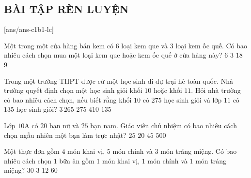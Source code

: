 \subsection{BÀI TẬP RÈN LUYỆN}
 
\setcounter{ex}{0}
[ans/ans-c1b1-lc]
\begin{ex}%
	Một trong một cửa hàng bán kem có $6$ loại kem que và $3$ loại kem ốc quế. Có bao nhiêu cách chọn mua một loại kem que hoặc kem ốc quế ở cửa hàng này?
	\choice
	{$6$}
	{$3$}
	{$18$}
	{\True $9$} 
\end{ex}
\begin{ex}%
	Trong một trường THPT được cử một học sinh đi dự trại hè toàn quốc. Nhà trường quyết định chọn một học sinh giỏi khối $10$ hoặc khối $11$. Hỏi nhà trường có bao nhiêu cách chọn, nếu biết rằng khối $10$ có $275$ học sinh giỏi và lớp $11$ có $135$ học sinh giỏi?
	\choice
	{$3\,265$}
	{$275$}
	{\True $410$}
	{$135$}
\end{ex}
\begin{ex}%
	Lớp $10$A có $20$ bạn nữ và $25$ bạn nam. Giáo viên chủ nhiệm có bao nhiêu cách chọn ngẫu nhiên một bạn làm trực nhật?
	\choice
	{$25$}
	{$20$}
	{\True $45$}
	{$500$}
\end{ex}
\begin{ex}%
	Một thực đơn gồm $4$ món khai vị, $5$ món chính và $3$ món tráng miệng. Có bao nhiêu cách chọn $1$ bữa ăn gồm $1$ món khai vị, $1$ món chính và $1$ món tráng miệng?
	\choice
	{$30$}
	{$3$}
	{$12$}
	{\True $60$}
\end{ex}
